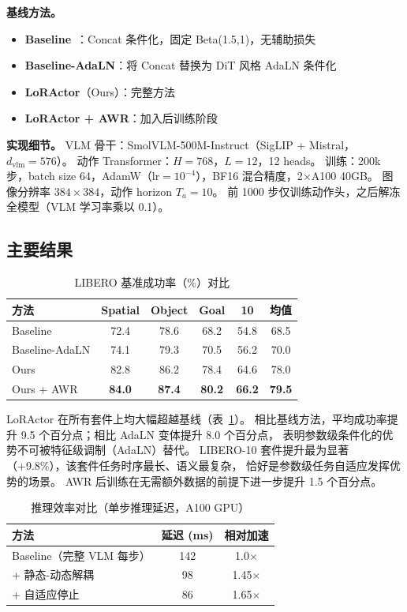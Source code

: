 \documentclass[10pt,twocolumn]{ctexart}
\begin{document}
\textbf{基线方法。}
\begin{itemize}[leftmargin=*,noitemsep]
    \item \textbf{Baseline}~\cite{simvla2024}：Concat 条件化，固定 Beta(1.5,1)，无辅助损失
    \item \textbf{Baseline-AdaLN}：将 Concat 替换为 DiT 风格 AdaLN 条件化~\cite{peebles2023dit}
    \item \textbf{LoRActor}（Ours）：完整方法
    \item \textbf{LoRActor + AWR}：加入后训练阶段
\end{itemize}

\textbf{实现细节。}
VLM 骨干：SmolVLM-500M-Instruct（SigLIP + Mistral，$d_\text{vlm}=576$）。
动作 Transformer：$H=768$，$L=12$，12 heads。
训练：200k 步，batch size 64，AdamW（$\text{lr}=10^{-4}$），BF16 混合精度，2$\times$A100 40GB。
图像分辨率 $384\times384$，动作 horizon $T_a=10$。
前 1000 步仅训练动作头，之后解冻全模型（VLM 学习率乘以 0.1）。

\subsection{主要结果}

\begin{table}[t]
\centering
\caption{LIBERO 基准成功率（\%）对比}
\label{tab:main}
\begin{tabular}{lccccc}
\toprule
方法 & Spatial & Object & Goal & 10 & 均值 \\
\midrule
Baseline & 72.4 & 78.6 & 68.2 & 54.8 & 68.5 \\
Baseline-AdaLN & 74.1 & 79.3 & 70.5 & 56.2 & 70.0 \\
\midrule
Ours & 82.8 & 86.2 & 78.4 & 64.6 & 78.0 \\
Ours + AWR & \textbf{84.0} & \textbf{87.4} & \textbf{80.2} & \textbf{66.2} & \textbf{79.5} \\
\bottomrule
\end{tabular}
\end{table}

LoRActor 在所有套件上均大幅超越基线（表~\ref{tab:main}）。
相比基线方法，平均成功率提升 9.5 个百分点；相比 AdaLN 变体提升 8.0 个百分点，
表明参数级条件化的优势不可被特征级调制（AdaLN）替代。
LIBERO-10 套件提升最为显著（+9.8\%），该套件任务时序最长、语义最复杂，
恰好是参数级任务自适应发挥优势的场景。
AWR 后训练在无需额外数据的前提下进一步提升 1.5 个百分点。

\begin{table}[t]
\centering
\caption{推理效率对比（单步推理延迟，A100 GPU）}
\label{tab:latency}
\begin{tabular}{lcc}
\toprule
方法 & 延迟 (ms) & 相对加速 \\
\midrule
Baseline（完整 VLM 每步） & 142 & 1.0$\times$ \\
+ 静态-动态解耦 & 98 & 1.45$\times$ \\
+ 自适应停止 & 86 & 1.65$\times$ \\
\bottomrule
\end{tabular}
\end{table}
\end{document}
